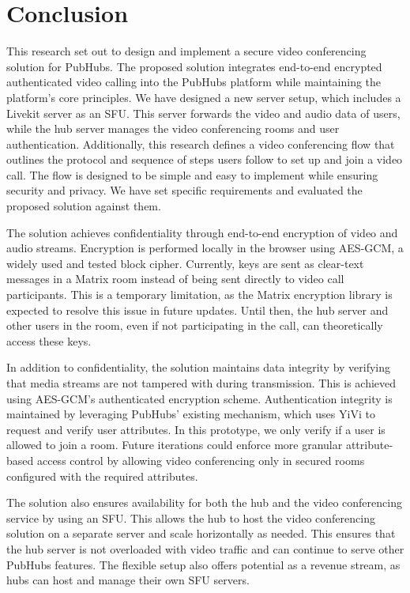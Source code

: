 \documentclass{report}
\begin{document}
\chapter{Conclusion}
This research set out to design and implement a secure video conferencing solution for PubHubs. The proposed
solution integrates end-to-end encrypted authenticated video calling into the PubHubs platform while maintaining
the platform's core principles. We have designed a new server setup, which includes a Livekit server as an SFU.
This server forwards the video and audio data of users, while the hub server manages the video conferencing rooms
and user authentication. Additionally, this research defines a video conferencing flow that outlines the protocol
and sequence of steps users follow to set up and join a video call. The flow is designed to be simple and easy to
implement while ensuring security and privacy. We have set specific requirements and evaluated the proposed
solution against them.

The solution achieves confidentiality through end-to-end encryption of video and audio streams. Encryption is
performed locally in the browser using AES-GCM, a widely used and tested block cipher. Currently, keys are sent as
clear-text messages in a Matrix room instead of being sent directly to video call participants. This is a temporary
limitation, as the Matrix encryption library is expected to resolve this issue in future updates. Until then, the
hub server and other users in the room, even if not participating in the call, can theoretically access these keys.

In addition to confidentiality, the solution maintains data integrity by verifying that media streams are not
tampered with during transmission. This is achieved using AES-GCM’s authenticated encryption scheme. Authentication
integrity is maintained by leveraging PubHubs’ existing mechanism, which uses YiVi to request and verify user
attributes. In this prototype, we only verify if a user is allowed to join a room. Future iterations could enforce
more granular attribute-based access control by allowing video conferencing only in secured rooms configured with
the required attributes.

The solution also ensures availability for both the hub and the video conferencing service by using an SFU. This
allows the hub to host the video conferencing solution on a separate server and scale horizontally as needed. This
ensures that the hub server is not overloaded with video traffic and can continue to serve other PubHubs features.
The flexible setup also offers potential as a revenue stream, as hubs can host and manage their own SFU servers.
\end{document}
